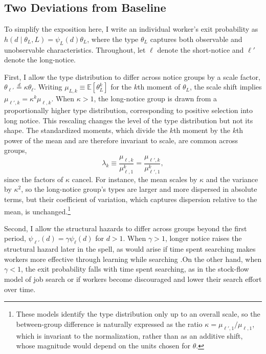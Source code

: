 \documentclass{div}
\begin{document}
\subsection{Two Deviations from Baseline}

To simplify the exposition here, I write an individual worker's exit probability as $h(d \mid \theta_L, L)=\psi_L(d)\theta_L$, where the type $\theta_L$ captures both observable and unobservable characteristics. Throughout, let $\ell$ denote the short-notice and $\ell'$ denote the long-notice. 

First, I allow the type distribution to differ across notice groups by a scale factor, $\theta_{\ell'} \overset{d}{=} \kappa\theta_{\ell}$. Writing $\mu_{L,k} \equiv \mathbb{E}[\theta_L^k]$ for the $k$th moment of $\theta_L$, the scale shift implies $\mu_{\ell',k} = \kappa^k \mu_{\ell,k}$. When $\kappa>1$, the long-notice group is drawn from a proportionally higher type distribution, corresponding to positive selection into long notice. This rescaling changes the level of the type distribution but not its shape. The standardized moments, which divide the $k$th moment by the $k$th power of the mean and are therefore invariant to scale, are common across groups,
\[
    \lambda_k \equiv \frac{\mu_{\ell,k}}{\mu_{\ell,1}^k}
              = \frac{\mu_{\ell',k}}{\mu_{\ell',1}^k},
\]
since the factors of $\kappa$ cancel. For instance, the mean scales by $\kappa$ and the variance by $\kappa^2$, so the long-notice group's types are larger and more dispersed in absolute terms, but their coefficient of variation, which captures dispersion relative to the mean, is unchanged.\footnote{These models identify the type distribution only up to an overall scale, so the between-group difference is naturally expressed as the ratio $\kappa=\mu_{\ell',1}/\mu_{\ell,1}$, which is invariant to the normalization, rather than as an additive shift, whose magnitude would depend on the units chosen for $\theta$.}


Second, I allow the structural hazards to differ across groups beyond the first period, $\psi_{\ell'}(d)=\gamma\psi_\ell(d)$ for $d>1$. When $\gamma>1$, longer notice raises the structural hazard later in the spell, as would arise if time spent searching makes workers more effective through learning while searching \citep{BurdettVishwanath1988, GonzalezShi2010}.On the other hand, when $\gamma<1$, the exit probability falls with time spent searching, as in the stock-flow model of job search \citep{ColesSmith1998} or if workers become discouraged and lower their search effort over time.
\end{document}
